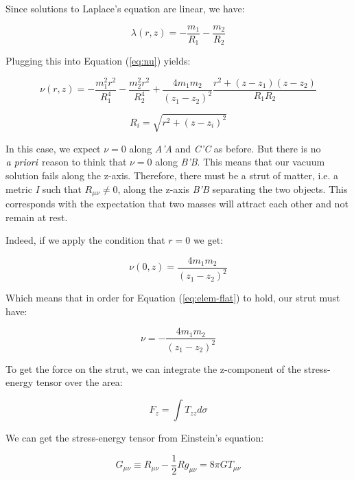 \documentclass{article}
\begin{document}
Since solutions to Laplace's equation are linear, we have:

\begin{equation}
\lambda (r,z)=-\frac{m_{1}}{R_{1}}-\frac{m_{2}}{R_{2}}\label{eq:2-m}
\end{equation}

Plugging this into Equation (\ref{eq:nu}) yields:

\begin{equation}
\nu (r,z)=-\frac{m_{1}^{2}r^{2}}{R_{1}^{4}}-\frac{m_{2}^{2}r^{2}}{R_{2}^{4}}+\frac{4m_{1}m_{2}}{\left(z_{1}-z_{2}\right)^{2}}\frac{r^{2}+\left(z-z_{1}\right)\left(z-z_{2}\right)}{R_{1}R_{2}}
\end{equation}

\begin{equation}
R_{i}=\sqrt{r^{2}+\left(z-z_{i}\right)^{2}}
\end{equation}

In this case, we expect $\nu=0$ along \emph{A'A} and \emph{C'C} as before. But there is no $\emph{a priori}$ reason to think that $\nu=0$ along \emph{B'B}.
This means that our vacuum solution fails along the z-axis. Therefore, there must be a strut of matter, i.e. a metric \emph{I} such that $R_{\mu\nu}\neq 0$, along the z-axis \emph{B'B} separating the two objects. This corresponds with the expectation that two masses will attract each other and not remain at rest.

Indeed, if we apply the condition that $r=0$ we get:

\begin{equation}
\nu (0,z)=\frac{4m_{1}m_{2}}{\left(z_{1}-z_{2}\right)^{2}}
\end{equation}

Which means that in order for Equation (\ref{eq:elem-flat}) to hold, our strut must have:

\begin{equation}
\nu=-\frac{4m_{1}m_{2}}{\left(z_{1}-z_{2}\right)^{2}}
\end{equation}

To get the force on the strut, we can integrate the z-component of the stress-energy tensor over the area:

\begin{equation}
F_{z}=\int T_{zz}d\sigma
\end{equation}

We can get the stress-energy tensor from Einstein's equation:

\begin{equation}
G_{\mu\nu}\equiv R_{\mu\nu}-\frac{1}{2}Rg_{\mu\nu}=8\pi GT_{\mu\nu}
\end{equation}
\end{document}
